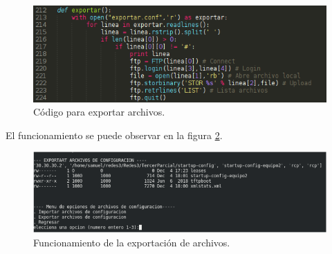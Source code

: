 \FloatBarrier
\begin{figure}[htbp!]
		\centering
			\includegraphics[width=.75 \textwidth]{images/export-codigo}
		\caption{Código para exportar archivos.}
		\label{image:export-codigo}
\end{figure}
\FloatBarrier

El funcionamiento se puede observar en la figura \ref{image:export-func}.

\FloatBarrier
\begin{figure}[htbp!]
		\centering
			\includegraphics[width=.8 \textwidth]{images/export-func}
		\caption{Funcionamiento de la exportación de archivos.}
		\label{image:export-func}
\end{figure}
\FloatBarrier